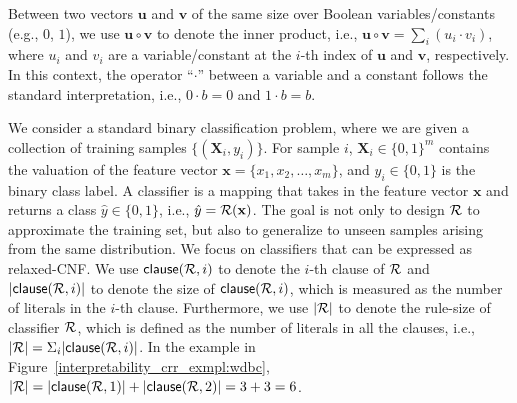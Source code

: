 



Between two vectors  $\mathbf{u}$ and $\mathbf{v}$ of the same size over Boolean variables/constants (e.g.,  $ 0 $, $ 1 $), we use $\mathbf{u} \circ \mathbf{v} $  to denote the inner product, i.e.,     $\mathbf{u} \circ \mathbf{v} = \sum_{i} (u_{i} \cdot v_{i})$, where $u_{i}$ and $v_{i}$ are a variable/constant  at the $i$-th index of $\mathbf{u}$ and $\mathbf{v}$, respectively. In this context,  the operator ``$\cdot$'' between a variable and a constant follows the standard interpretation, i.e., $0 \cdot b = 0$ and $1 \cdot b = b$. 


We consider a standard binary classification problem, where we are given a collection of 
training samples $\{ (\mathbf{X}_i, y_i) \}$. For sample $ i $, $\mathbf{X}_i \in \{0,1\}^m$ contains the valuation of the feature vector $\mathbf{x} = \{x_1, x_2, \dots, x_m\}$, and $y_i \in \{0,1\}$ is the binary class label.
A classifier {\Rule} is a mapping that takes in the feature vector $\mathbf{x}$ and returns a class $\hat{y} \in \{0,1\}$, i.e., $\hat{y} = {\mathcal{R}}(\mathbf{x})$. The goal is not 
only to design ${\mathcal{R}}$ to approximate the training set, but also to generalize to unseen samples arising from the same distribution. 
We focus on classifiers that can be expressed  as  relaxed-CNF. We use $\mathsf{clause}({\mathcal{R}},i)$ to denote  the  $i$-th clause of ${\mathcal{R}}$ and $ |\mathsf{clause}({\mathcal{R}},i)| $ to  denote the size of  $\mathsf{clause}({\mathcal{R}},i)$, which is measured as the number of literals in the $ i $-th clause. Furthermore, we use $|{\mathcal{R}}|$ to denote the rule-size of classifier $ {\mathcal{R}} $, which is defined as the number of literals in all the clauses, i.e., $|{\mathcal{R}}| = \Sigma_i |\mathsf{clause}({\mathcal{R}},i)|$. In the example in Figure~\ref{interpretability_crr_exmpl:wdbc}, $ |{\mathcal{R}}| = |\mathsf{clause}({\mathcal{R}}, 1)| + |\mathsf{clause}({\mathcal{R}}, 2)| = 3+3=6 $.


